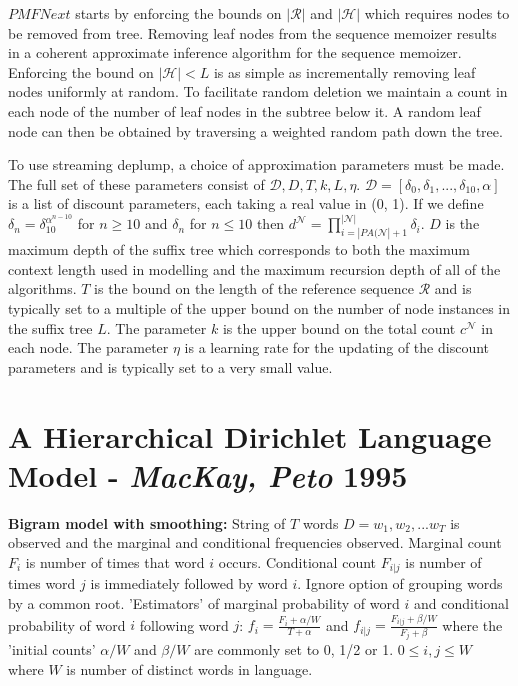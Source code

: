 $PMFNext$ starts by enforcing the bounds on $|\mathcal{R}|$ and $|\mathcal{H}|$ which requires nodes to be removed from tree. Removing leaf nodes from the sequence memoizer results in a coherent approximate inference algorithm for the sequence memoizer. Enforcing the bound on $|\mathcal{H}|<L$ is as simple as incrementally removing leaf nodes uniformly at random. To facilitate random deletion we maintain a count in each node of the number of leaf nodes in the subtree below it. A random leaf node can then be obtained by traversing a weighted random path down the tree.

To use streaming deplump, a choice of approximation parameters must be made. The full set of these parameters consist of $\mathcal{D}, D, T, k, L, \eta$. $\mathcal{D} = [\delta_{0}, \delta_{1}, ..., \delta_{10}, \alpha]$ is a list of discount parameters, each taking a real value in (0, 1). If we define $\delta_{n}=\delta_{10}^{\alpha^{n-10}}$ for $n\geq 10$ and $\delta_{n}$ for $n\leq 10$ then $d^{\mathcal{N}}=\prod_{i=|PA(\mathcal{N}|+1}^{|\mathcal{N}|}\delta_{i}$. $D$ is the maximum depth of the suffix tree which corresponds to both the maximum context length used in modelling and the maximum recursion depth of all of the algorithms. $T$ is the bound on the length of the reference sequence $\mathcal{R}$ and is typically set to a multiple of the upper bound on the number of node instances in the suffix tree $L$. The parameter $k$ is the upper bound on the total count $c^{\mathcal{N}}$ in each node. The parameter $\eta$ is a learning rate for the updating of the discount parameters and is typically set to a very small value.

\section{A Hierarchical Dirichlet Language Model - \textit{MacKay, Peto} 1995}   \cite{mackay1995hierarchical}

\textbf{Bigram model with smoothing: } String of $T$ words $D=w_{1}, w_{2}, ... w_{T}$ is observed and the marginal and conditional frequencies observed. Marginal count $F_{i}$ is number of times that word $i$ occurs. Conditional count $F_{i|j}$ is number of times word $j$ is immediately followed by word $i$. Ignore option of grouping words by a common root. 'Estimators' of marginal probability of word $i$ and conditional probability of word $i$ following word $j$: $f_{i}=\frac{F_{i}+\alpha/W}{T+\alpha}$ and $f_{i|j}=\frac{F_{i|j}+\beta/W}{F_{j}+\beta}$ where the 'initial counts' $\alpha/W$ and $\beta/W$ are commonly set to 0, 1/2 or 1. $0\leq i,j\leq W$ where $W$ is number of distinct words in language. 

